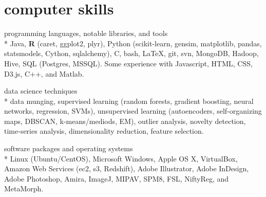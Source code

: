 \documentclass[print]{friggeri-cv} %
\begin{document}
\newpage
\section{computer skills}
\begin{description}
   \item {\smallheaderfont programming languages, notable libraries, and tools} \\*
        Java, \textbf{R} (caret, ggplot2, plyr), Python (scikit-learn, gensim,
        matplotlib, pandas, statsmodels, Cython, sqlalchemy), C, bash,
        \LaTeX, git, svn, MongoDB, Hadoop, Hive, SQL (Postgres,
        MSSQL). Some experience with Javascript, HTML, CSS, D3.js, C++, and
        Matlab.
    \item {\smallheaderfont data science techniques} \\*
        data munging, supervised learning (random forests, gradient boosting,
        neural networks, regression, SVMs), unsupervised learning
        (autoencoders, self-organizing maps, DBSCAN, k-means/mediods, EM),
        outlier analysis, novelty detection, time-series analysis,
        dimensionality reduction, feature selection.
    \item {\smallheaderfont software packages and operating systems} \\* Linux
      (Ubuntu/CentOS), Microsoft Windows, Apple OS X, VirtualBox, Amazon Web
      Services (ec2, s3, Redshift), Adobe Illustrator, Adobe InDesign, Adobe
      Photoshop, Amira, ImageJ, MIPAV, SPM8, FSL, NiftyReg, and MetaMorph.
\end{description}
\end{document}
